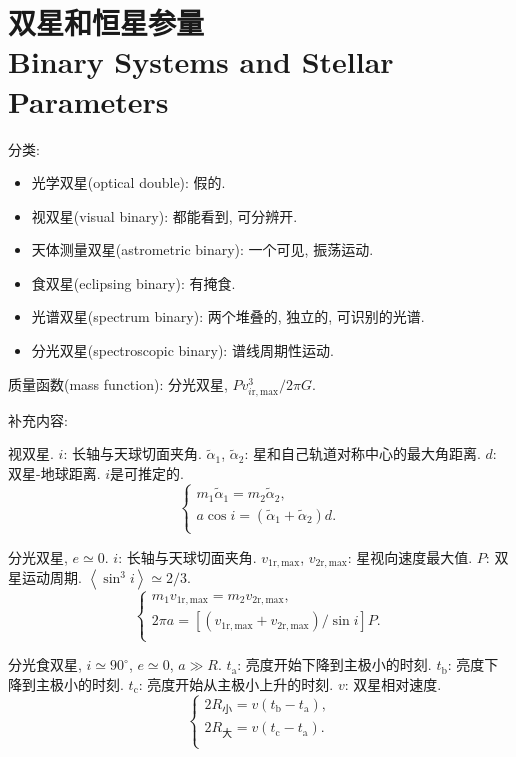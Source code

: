 \chapter{双星和恒星参量\\Binary Systems and Stellar Parameters}

分类:
\begin{itemize}
    \item 光学双星(optical double): 假的.
    \item 视双星(visual binary): 都能看到, 可分辨开.
    \item 天体测量双星(astrometric binary): 一个可见, 振荡运动.
    \item 食双星(eclipsing binary): 有掩食.
    \item 光谱双星(spectrum binary): 两个堆叠的, 独立的, 可识别的光谱.
    \item 分光双星(spectroscopic binary): 谱线周期性运动.
\end{itemize}

质量函数(mass function): 分光双星, $Pv_{i\text{r},\text{max}}^3/2\pi G$.

补充内容: 

视双星. $i$: 长轴与天球切面夹角. $\tilde{\alpha}_1$, $\tilde{\alpha}_2$: 星和自己轨道对称中心的最大角距离. $d$: 双星-地球距离. $i$是可推定的.
\begin{equation*}
    \begin{cases}
        m_1 \tilde{\alpha}_1 = m_2 \tilde{\alpha}_2, \\
        a \cos i = (\tilde{\alpha}_1+\tilde{\alpha}_2) d. \\
    \end{cases}
\end{equation*}

分光双星, $e\simeq0$. $i$: 长轴与天球切面夹角. $v_{1\text{r},\text{max}}$, $v_{2\text{r},\text{max}}$: 星视向速度最大值. $P$: 双星运动周期. $\left\langle \sin^3 i\right\rangle \simeq 2/3$.
\begin{equation*}
    \begin{cases}
        m_1 v_{1\text{r},\text{max}} = m_2 v_{2\text{r},\text{max}}, \\
        2 \pi a = [(v_{1\text{r},\text{max}}+v_{2\text{r},\text{max}}) / \sin i] P. \\
    \end{cases}
\end{equation*}

分光食双星, $i\simeq90^{\circ}$, $e\simeq0$, $a\gg R$. $t_\text{a}$: 亮度开始下降到主极小的时刻. $t_\text{b}$: 亮度下降到主极小的时刻. $t_\text{c}$: 亮度开始从主极小上升的时刻. $v$: 双星相对速度.
\begin{equation*}
    \begin{cases}
        2 R_\text{小} = v (t_\text{b}-t_\text{a}), \\
        2 R_\text{大} = v (t_\text{c}-t_\text{a}). \\
    \end{cases}
\end{equation*}


